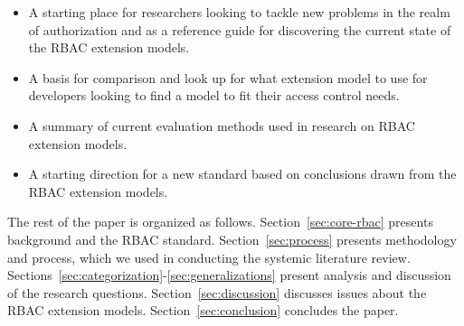 \begin{itemize}
\setlength{\itemsep}{0.25pt}
\item A starting place for researchers looking to tackle new problems in the realm of authorization and as a reference guide for discovering
the current state of the RBAC extension models. 
\item A basis for comparison and look up for what extension model to use for developers looking to find a model to fit their access control needs.
\item A summary of current evaluation methods used in research on RBAC extension models.
\item A starting direction for a new standard based on conclusions drawn from the RBAC extension models.
\end{itemize}

The rest of the paper is organized as follows. 
Section~\ref{sec:core-rbac} presents background and the RBAC standard. 
Section~\ref{sec:process} presents methodology and process, which we used in conducting the systemic literature review. 
Sections~\ref{sec:categorization}-\ref{sec:generalizations} present analysis and discussion of the research questions. 
Section~\ref{sec:discussion} discusses issues about the RBAC extension models.
Section~\ref{sec:conclusion} concludes the paper.
